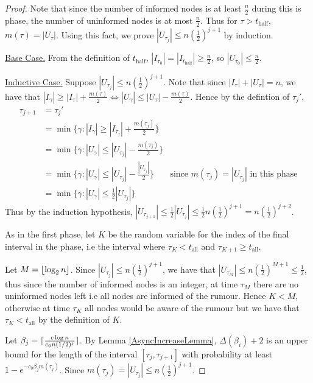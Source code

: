 \begin{proof}
	Note that since the number of informed nodes is at least $\frac{n}{2}$ during this is phase, the number of uninformed nodes is at most $\frac{n}{2}$. Thus for $\tau > t_\text{half}$, $m(\tau) = |U_\tau|$. Using this fact, we prove $|U_{\tau_j}| \leq n(\frac{1}{2})^{j+1}$ by induction.

	\underline{Base Case.}
	From the definition of $t_\text{half}$, $|I_{\tau_0}| = |I_{t_\text{half}}| \geq \frac{n}{2}$, so $|U_{\tau_0}| \leq \frac{n}{2}$.

	\underline{Inductive Case.} Suppose $|U_{\tau_j}| \leq n(\frac{1}{2})^{j+1}$. Note that since $|I_\tau| + |U_\tau| = n$, we have that $|I_{\gamma}| \geq |I_\tau| + \frac{m(\tau)}{2} \iff |U_\gamma| \leq |U_\tau| - \frac{m(\tau)}{2}$. Hence by the defintion of $\tau_j'$,
	\begin{align*}
		\tau_{j+1} &= \tau_j' \\
		&= \min \{ \gamma : |I_\gamma| \geq |I_{\tau_j}| + \frac{m(\tau_j)}{2}\} \\
		&= \min \{ \gamma : |U_\gamma| \leq |U_{\tau_j}| - \frac{m(\tau_j)}{2}\} \\
		&= \min \{ \gamma : |U_\gamma| \leq |U_{\tau_j}| - \frac{|U_{\tau_j}|}{2}\} & \text{since } m(\tau_j) = |U_{\tau_j}| \text{ in this phase} \\
		&= \min \{ \gamma : |U_\gamma| \leq \frac{1}{2}|U_{\tau_j}|\}
	\end{align*}
	Thus by the induction hypothesis, $|U_{\tau_{j+1}}| \leq \frac{1}{2}|U_{\tau_j}| \leq \frac{1}{2}n(\frac{1}{2})^{j+1} = n(\frac{1}{2})^{j+2}$.

	As in the first phase, let $K$ be the random variable for the index of the final interval in the phase, i.e the interval where $\tau_K < t_\text{all}$ and $\tau_{K+1} \geq t_\text{all}$.

	Let $M = \lfloor\log_2 n\rfloor$. Since $|U_{\tau_j}| \leq n(\frac{1}{2})^{j+1}$, we have that $|U_{\tau_M}| \leq n(\frac{1}{2})^{M+1} \leq \frac{1}{2}$, thus since the number of informed nodes is an integer, at time $\tau_M$ there are no uninformed nodes left i.e all nodes are informed of the rumour. Hence $K < M$, otherwise at time $\tau_K$ all nodes would be aware of the rumour but we have that $\tau_K < t_\text{all}$ by the definition of $K$.

	Let $\beta_j = \lceil\frac{c \log n}{c_0 n(1/2)^j}\rceil$. %
	By Lemma \ref{AsyncIncreaseLemma}, $\Delta(\beta_i) + 2$ is an upper bound for the length of the interval $[\tau_j, \tau_{j+1}]$ 
	with probability at least $1 - e^{-c_0\beta_j m(\tau_j)}$. %
	Since $m(\tau_j) = |U_{\tau_j}| \leq n(\frac{1}{2})^{j+1}$. %

\end{proof}

